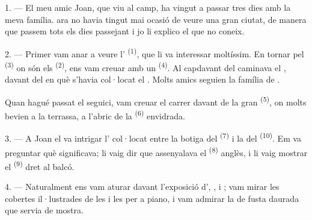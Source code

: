 %

\VUsaut{4.0mm}
\VUsaut{3.0mm}

\VUsaut{3.0mm}

1. --- El meu amic Joan, que viu al camp, ha vingut a passar tres dies amb la
meva família.  ara no havia tingut mai ocasió de veure una gran
ciutat, de manera que passem tots els dies passejant i jo li explico el que no
coneix.

2. --- Primer vam anar a veure l' \textsuperscript{(1)}, que li
va interessar moltíssim. En tornar pel  \textsuperscript{(3)} on són
els  \textsuperscript{(2)}, ens vam creuar amb un
 \textsuperscript{(4)}. Al capdavant del  caminava el , davant del  en què
s'havia col·locat el . Molts amics seguien la família de
.

Quan hagué passat el seguici, vam creuar el carrer davant de la gran
 \textsuperscript{(5)}, on molts  bevien
 a la terrassa, a l'abric de la 
\textsuperscript{(6)} envidrada.

3. --- A Joan el va intrigar l' col·locat entre la botiga
del  \textsuperscript{(7)} i la del
 \textsuperscript{(10)}. Em va preguntar què significava;
li vaig dir que assenyalava el  \textsuperscript{(8)} anglès, i li
vaig mostrar el  \textsuperscript{(9)} dret al balcó.

\VUsaut{3.0mm}

4. --- Naturalment ens vam aturar davant l'exposició d', ,  i ; vam mirar les
cobertes il·lustrades de les  i les  per a piano,
i vam admirar la  de fusta daurada que servia de mostra.

